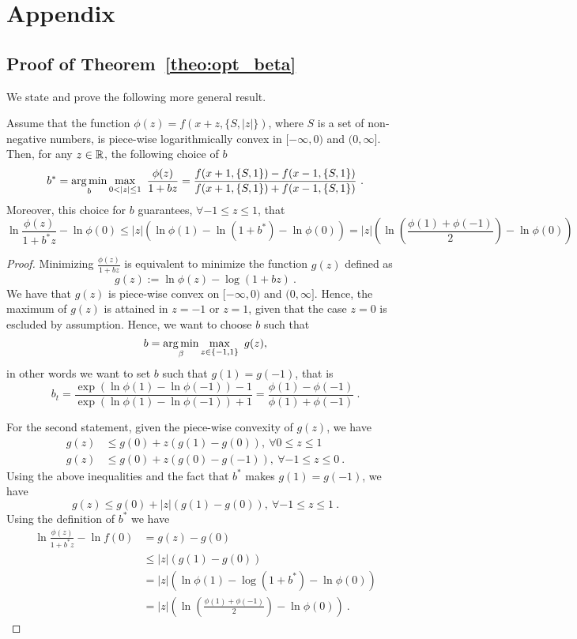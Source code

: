 \appendix
\section{Appendix}

\subsection{Proof of Theorem~\ref{theo:opt_beta}}

We state and prove the following more general result.
\begin{theorem}
\label{theo:opt_beta_expanded}
Assume that the function $\phi(z)=f(x+z,\{S, |z|\})$, where $S$ is a set of non-negative numbers, is piece-wise logarithmically convex in $[-\infty,0)$ and $(0,\infty]$. Then, for any $z\in \mathbb{R}$,  the following choice of $b$
\[
b^* = \argmin_{b} \max_{0<|z|\leq 1} \ \frac{\phi(z)}{1+b z} =\frac{f(x+1,\{S, 1\}) - f(x-1,\{S, 1\})}{f(x+1,\{S, 1\}) + f(x-1,\{S, 1\})}~.
\]
Moreover, this choice for $b$ guarantees, $\forall -1 \leq z\leq 1$, that 
\[
\ln \frac{\phi(z)}{1+b^* z} - \ln \phi(0)\leq  |z| \left(\ln \phi(1) - \ln (1+b^*)- \ln \phi(0)\right) =  |z| \left(\ln \left(\frac{\phi(1)+\phi(-1)}{2}\right)- \ln \phi(0)\right)
\]
\end{theorem}
\begin{proof}
Minimizing $\frac{\phi(z)}{1+b z}$ is equivalent to minimize the function $g(z)$ defined as
\[
g(z) := \ln \phi(z) - \log(1+b z)~.
\]
We have that $g(z)$ is piece-wise convex on $[-\infty,0)$ and $(0,\infty]$. 
Hence, the maximum of $g(z)$ is attained in $z=-1$ or $z=1$, given that the case $z=0$ is escluded by assumption.
Hence, we want to choose $b$ such that
\[
b = \operatorname*{arg\,min}_{\beta} \max_{z \in \{-1, 1\}} \ g(z),
\]
in other words we want to set $b$ such that $g(1)=g(-1)$, that is
\[
b_t = \frac{\exp\left(\ln \phi(1) - \ln \phi(-1)\right)-1}{\exp\left(\ln \phi(1) - \ln \phi(-1)\right)+1} 
= \frac{\phi(1) - \phi(-1)}{\phi(1) + \phi(-1)}~.
\]

For the second statement, given the piece-wise convexity of $g(z)$, we have
\begin{align*}
g(z) &\leq g(0) + z (g(1)-g(0)), \ \forall 0 \leq z\leq 1 \\
g(z) &\leq g(0) + z (g(0)-g(-1)), \ \forall -1 \leq z\leq 0~.
\end{align*}
Using the above inequalities and the fact that $b^*$ makes $g(1)=g(-1)$, we have
\[
g(z) \leq g(0) + |z| (g(1)-g(0)), \ \forall -1 \leq z\leq 1~.
\]
Using the definition of $b^*$ we have
\begin{align*}
\ln \frac{\phi(z)}{1+b^* z} - \ln f(0)
&= g(z) - g(0) \\
& \leq |z| (g(1)-g(0)) \\
& = |z| \left(\ln \phi(1) - \log(1+b^*) - \ln \phi(0)\right) \\
& = |z| \left(\ln\left(\frac{\phi(1)+\phi(-1)}{2}\right) - \ln \phi(0)\right)~.
\end{align*}

\end{proof}

